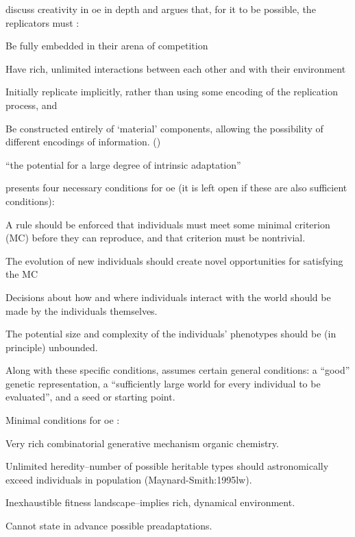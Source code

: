 \begin{DRAFT}
\Textcite{Taylor2001,Taylor:1999sc} discuss creativity in \gls{oe} in depth and argues that, for it to be possible, the replicators must \parencite{Hutton2004}:
\begin{compactenum}
	\item Be fully embedded in their arena of competition 
	\item Have rich, unlimited interactions between each other and with their environment 
	\item Initially replicate implicitly, rather than using some encoding of the replication process, and 
	\item Be constructed entirely of `material' components, allowing the possibility of different encodings of information. ()
\end{compactenum}

``the potential for a large degree of intrinsic adaptation'' \parencite{Taylor2001}

\parencite{Soros2014} presents four necessary conditions for \gls{oe} (it is left open if these are also sufficient conditions):
\begin{compactenum}
	\item A rule should be enforced that individuals must meet some minimal criterion (MC) before they can reproduce, and that criterion must be nontrivial.
	\item The evolution of new individuals should create novel opportunities for satisfying the MC
	\item Decisions about how and where individuals interact with the world should be made by the individuals themselves.
	\item The potential size and complexity of the individuals' phenotypes should be (in principle) unbounded.
\end{compactenum}
Along with these specific conditions, \parencite{Soros2014} assumes certain general conditions: a ``good'' genetic representation, a ``sufficiently large world for every individual to be evaluated'', and a seed or starting point.

Minimal conditions for \gls{oe} \parencite{Vasas2015}:
\begin{compactenum}
	\item Very rich combinatorial generative mechanism \eg organic chemistry.
	\item Unlimited heredity--number of possible heritable types should astronomically exceed individuals in population (Maynard-Smith:1995lw).
	\item Inexhaustible fitness landscape--implies rich, dynamical environment.
	\item Cannot state in advance possible preadaptations.
\end{compactenum}


\end{DRAFT}
